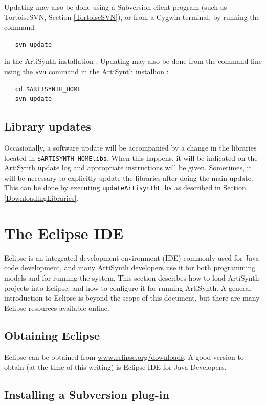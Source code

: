 \ifWindows
Updating may also be done using a Subversion client program
(such as TortoiseSVN, Section \ref{TortoiseSVN}), or
from a Cygwin terminal, by running the command
\begin{verbatim}
   svn update 
\end{verbatim}
in the ArtiSynth installation \directory.
\else
Updating may also be done from the command line using the {\tt svn}
command in the ArtiSynth installion \directory:
\begin{verbatim}
   cd $ARTISYNTH_HOME
   svn update 
\end{verbatim}
\fi

\subsection{Library updates}

Occasionally, a software update will be accompanied by a change in the
libraries located in {\tt \$ARTISYNTH\_HOME\SEP libs}.  When this
happens, it will be indicated on the ArtiSynth update log and
appropriate instructions will be given. Sometimes, it will be
necessary to explicitly update the libraries after doing the main
update. This can be done by executing {\tt updateArtisynthLibs} as
described in Section \ref{DownloadingLibraries}.

\section{The Eclipse IDE}
\label{EclipseIDE}

Eclipse is an integrated development environment (IDE) commonly used
for Java code development, and many ArtiSynth developers use it for
both programming models and for running the system. This section
describes how to load ArtiSynth projects into Eclipse, and how to
configure it for running ArtiSynth. A general introduction to Eclipse
is beyond the scope of this document, but there are many Eclipse
resources available online.

\subsection{Obtaining Eclipse}

Eclipse can be obtained from
\href{http://www.eclipse.org/downloads}{www.eclipse.org/downloads}.  A
good version to obtain (at the time of this writing) is {\sf Eclipse
IDE for Java Developers}.

\subsection{Installing a Subversion plug-in}
\label{SubversionPlugIn}

